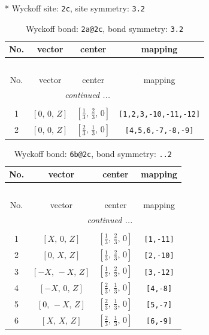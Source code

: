 \documentclass[fleqn,8pt]{jsarticle}
\begin{document}
* Wyckoff site: {\tt 2c}, site symmetry: {\tt 3.2}
\renewcommand{\arraystretch}{1.2}
\begin{longtable}{cccc}
\caption{Wyckoff bond: {\tt 2a@2c}, bond symmetry: {\tt 3.2}}
 \\
 \hline \hline
No. & vector & center & mapping \\ \hline \endfirsthead

\multicolumn{3}{l}{\tablename\ \thetable{}} \\
 \hline \hline
No. & vector & center & mapping \\ \hline \endhead

 \hline \hline
\multicolumn{3}{r}{\footnotesize\it continued ...} \\ \endfoot

 \hline \hline
\multicolumn{3}{r}{} \\ \endlastfoot

1 & $\left[ 0,\, 0,\, Z \right]$ & $\left[ \frac{1}{3},\, \frac{2}{3},\, 0 \right]$ & {\tt [1,2,3,-10,-11,-12]} \\ \hline
2 & $\left[ 0,\, 0,\, Z \right]$ & $\left[ \frac{2}{3},\, \frac{1}{3},\, 0 \right]$ & {\tt [4,5,6,-7,-8,-9]} \\
\end{longtable}
\renewcommand{\arraystretch}{1.2}
\begin{longtable}{cccc}
\caption{Wyckoff bond: {\tt 6b@2c}, bond symmetry: {\tt ..2}}
 \\
 \hline \hline
No. & vector & center & mapping \\ \hline \endfirsthead

\multicolumn{3}{l}{\tablename\ \thetable{}} \\
 \hline \hline
No. & vector & center & mapping \\ \hline \endhead

 \hline \hline
\multicolumn{3}{r}{\footnotesize\it continued ...} \\ \endfoot

 \hline \hline
\multicolumn{3}{r}{} \\ \endlastfoot

1 & $\left[ X,\, 0,\, Z \right]$ & $\left[ \frac{1}{3},\, \frac{2}{3},\, 0 \right]$ & {\tt [1,-11]} \\ \hline
2 & $\left[ 0,\, X,\, Z \right]$ & $\left[ \frac{1}{3},\, \frac{2}{3},\, 0 \right]$ & {\tt [2,-10]} \\ \hline
3 & $\left[ - X,\, - X,\, Z \right]$ & $\left[ \frac{1}{3},\, \frac{2}{3},\, 0 \right]$ & {\tt [3,-12]} \\ \hline
4 & $\left[ - X,\, 0,\, Z \right]$ & $\left[ \frac{2}{3},\, \frac{1}{3},\, 0 \right]$ & {\tt [4,-8]} \\ \hline
5 & $\left[ 0,\, - X,\, Z \right]$ & $\left[ \frac{2}{3},\, \frac{1}{3},\, 0 \right]$ & {\tt [5,-7]} \\ \hline
6 & $\left[ X,\, X,\, Z \right]$ & $\left[ \frac{2}{3},\, \frac{1}{3},\, 0 \right]$ & {\tt [6,-9]} \\
\end{longtable}
\end{document}
